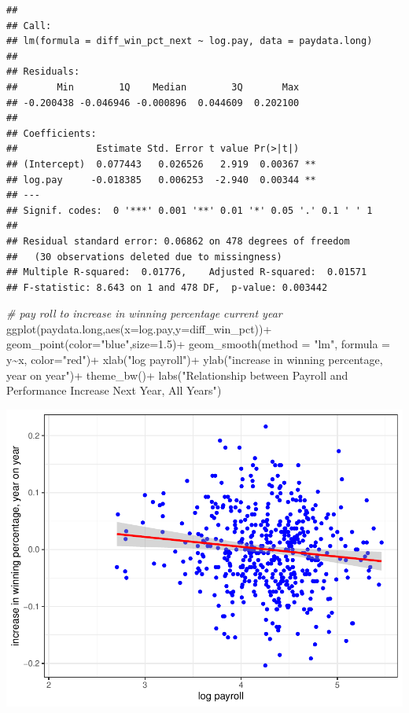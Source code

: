\documentclass[
  12pt,
]{article}
\newenvironment{Shaded}{\begin{snugshade}}{\end{snugshade}}
\newcommand{\AttributeTok}[1]{\textcolor[rgb]{0.77,0.63,0.00}{#1}}
\newcommand{\CommentTok}[1]{\textcolor[rgb]{0.56,0.35,0.01}{\textit{#1}}}
\newcommand{\FloatTok}[1]{\textcolor[rgb]{0.00,0.00,0.81}{#1}}
\newcommand{\FunctionTok}[1]{\textcolor[rgb]{0.00,0.00,0.00}{#1}}
\newcommand{\NormalTok}[1]{#1}
\newcommand{\SpecialCharTok}[1]{\textcolor[rgb]{0.00,0.00,0.00}{#1}}
\newcommand{\StringTok}[1]{\textcolor[rgb]{0.31,0.60,0.02}{#1}}
\begin{document}
\begin{verbatim}
## 
## Call:
## lm(formula = diff_win_pct_next ~ log.pay, data = paydata.long)
## 
## Residuals:
##       Min        1Q    Median        3Q       Max 
## -0.200438 -0.046946 -0.000896  0.044609  0.202100 
## 
## Coefficients:
##              Estimate Std. Error t value Pr(>|t|)   
## (Intercept)  0.077443   0.026526   2.919  0.00367 **
## log.pay     -0.018385   0.006253  -2.940  0.00344 **
## ---
## Signif. codes:  0 '***' 0.001 '**' 0.01 '*' 0.05 '.' 0.1 ' ' 1
## 
## Residual standard error: 0.06862 on 478 degrees of freedom
##   (30 observations deleted due to missingness)
## Multiple R-squared:  0.01776,    Adjusted R-squared:  0.01571 
## F-statistic: 8.643 on 1 and 478 DF,  p-value: 0.003442
\end{verbatim}

\begin{Shaded}
\begin{Highlighting}[]
\CommentTok{\# pay roll to increase in winning percentage current year}
\FunctionTok{ggplot}\NormalTok{(paydata.long,}\FunctionTok{aes}\NormalTok{(}\AttributeTok{x=}\NormalTok{log.pay,}\AttributeTok{y=}\NormalTok{diff\_win\_pct))}\SpecialCharTok{+}
  \FunctionTok{geom\_point}\NormalTok{(}\AttributeTok{color=}\StringTok{"blue"}\NormalTok{,}\AttributeTok{size=}\FloatTok{1.5}\NormalTok{)}\SpecialCharTok{+}
  \FunctionTok{geom\_smooth}\NormalTok{(}\AttributeTok{method =} \StringTok{"lm"}\NormalTok{, }\AttributeTok{formula =}\NormalTok{ y}\SpecialCharTok{\textasciitilde{}}\NormalTok{x, }\AttributeTok{color=}\StringTok{"red"}\NormalTok{)}\SpecialCharTok{+}
  \FunctionTok{xlab}\NormalTok{(}\StringTok{"log payroll"}\NormalTok{)}\SpecialCharTok{+}
  \FunctionTok{ylab}\NormalTok{(}\StringTok{"increase in winning percentage, year on year"}\NormalTok{)}\SpecialCharTok{+}
  \FunctionTok{theme\_bw}\NormalTok{()}\SpecialCharTok{+}
  \FunctionTok{labs}\NormalTok{(}\StringTok{"Relationship between Payroll and Performance Increase Next Year, All Years"}\NormalTok{)}
\end{Highlighting}
\end{Shaded}

\includegraphics{hw1_sol_files/figure-latex/unnamed-chunk-17-3.pdf}
\end{document}
